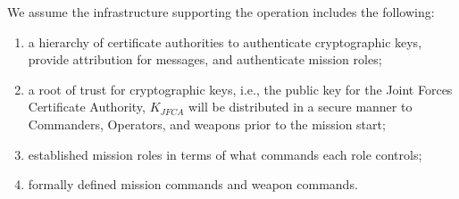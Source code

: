 
We assume the infrastructure supporting the operation includes the
following:
\begin{enumerate}
\item a hierarchy of certificate authorities to authenticate
  cryptographic keys, provide attribution for messages, and
  authenticate mission roles;
\item a root of trust for cryptographic keys, i.e., the public key
  for the Joint Forces Certificate Authority, $K_{JFCA}$ will be
  distributed in a secure manner to Commanders, Operators, and weapons
  prior to the mission start;
\item established mission roles in terms of what commands each role
  controls;
\item formally defined mission commands and weapon commands.
\end{enumerate}


